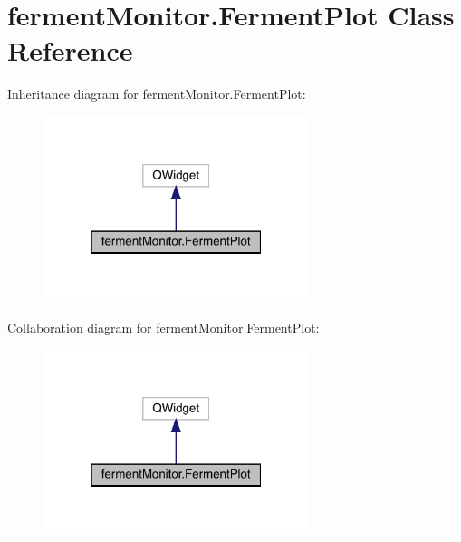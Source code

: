 \hypertarget{classferment_monitor_1_1_ferment_plot}{}\section{ferment\+Monitor.\+Ferment\+Plot Class Reference}
\label{classferment_monitor_1_1_ferment_plot}


Inheritance diagram for ferment\+Monitor.\+Ferment\+Plot\+:\nopagebreak
\begin{figure}[H]
\begin{center}
\leavevmode
\includegraphics[width=220pt]{classferment_monitor_1_1_ferment_plot__inherit__graph}
\end{center}
\end{figure}


Collaboration diagram for ferment\+Monitor.\+Ferment\+Plot\+:\nopagebreak
\begin{figure}[H]
\begin{center}
\leavevmode
\includegraphics[width=220pt]{classferment_monitor_1_1_ferment_plot__coll__graph}
\end{center}
\end{figure}
